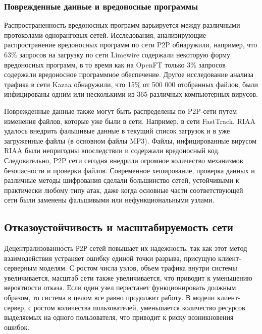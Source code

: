 \documentclass[bachelor, och, coursework]{SCWorks}
\begin{document}
\subsubsection{Поврежденные данные и вредоносные программы}
Распространенность вредоносных программ варьируется между различными протоколами одноранговых сетей. 
Исследования, анализирующие распространение вредоносных программ по сети P2P обнаружили, например, что 63\% запросов на загрузку 
по сети Limewire содержали некоторую форму вредоносных программ, в то время как на OpenFT только 3\% запросов содержали 
вредоносное программное обеспечение. Другое исследование анализа трафика в сети Kazaa обнаружили, что 15\% от 500 000 отобранных файлов, 
были инфицированы одним или несколькими из 365 различных компьютерных вирусов.

Поврежденные данные также могут быть распределены по P2P-сети путем изменения файлов, которые уже были в сети. 
Например, в сети FastTrack, RIAA удалось внедрить фальшивые данные в текущий список загрузок и в уже загруженные файлы (в основном файлы MP3). 
Файлы, инфицированные вирусом RIAA были непригодны впоследствии и содержали вредоносный код. 
Следовательно, P2P сети сегодня внедрили огромное количество механизмов безопасности и проверки файлов. 
Современное хеширование, проверка данных и различные методы шифрования сделали большинство сетей, устойчивыми к 
практически любому типу атак, даже когда основные части соответствующей сети были заменены фальшивыми или нефункциональными узлами.

\subsection{Отказоустойчивость и масштабируемость сети}
Децентрализованность Р2Р сетей повышает их надежность, так как этот метод взаимодействия устраняет ошибку единой точки разрыва, 
присущую клиент-серверным моделям. С ростом числа узлов, объем трафика внутри системы увеличивается, масштаб сети также увеличивается, 
что приводит к уменьшению вероятности отказа. Если один узел перестанет функционировать должным образом, 
то система в целом все равно продолжит работу. 
В модели клиент-сервер, с ростом количества пользователей, уменьшается количество ресурсов выделяемых на одного пользователя, 
что приводит к риску возникновения ошибок.
\end{document}

